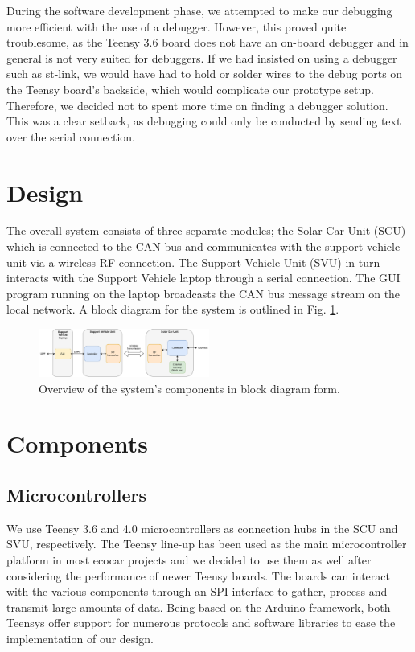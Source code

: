 \documentclass[conference]{IEEEtran}
\begin{document}
During the software development phase, we attempted to make our debugging more efficient with the use of a debugger. However, this proved quite troublesome, as the Teensy 3.6 board does not have an on-board debugger and in general is not very suited for debuggers. If we had insisted on using a debugger such as st-link, we would have had to hold or solder wires to the debug ports on the Teensy board's backside, which would complicate our prototype setup. Therefore, we decided not to spent more time on finding a debugger solution. This was a clear setback, as debugging could only be conducted by sending text over the serial connection.

\section{Design}
The overall system consists of three separate modules; the Solar Car Unit (SCU) which is connected to the CAN bus and communicates with the support vehicle unit via a wireless RF connection. The Support Vehicle Unit (SVU) in turn interacts with the Support Vehicle laptop through a serial connection. The GUI program running on the laptop broadcasts the CAN bus message stream on the local network. A block diagram for the system is outlined in Fig. \ref{fig:schematic}. 
\begin{figure}[H]
    \centering
    \includegraphics[width=0.5\textwidth]{documentation/images/SystemSchematic.pdf}
    \caption{Overview of the system's components in block diagram form.}
    \label{fig:schematic}
\end{figure}


\section{Components}

\subsection{Microcontrollers} %
We use Teensy 3.6 and 4.0 microcontrollers as connection hubs in the SCU and SVU, respectively. The Teensy line-up has been used as the main microcontroller platform in most ecocar projects and we decided to use them as well after considering the performance of newer Teensy boards. The boards can interact with the various components through an SPI interface to gather, process and transmit large amounts of data. Being based on the Arduino framework, both Teensys offer support for numerous protocols and software libraries to ease the implementation of our design. 
\end{document}
